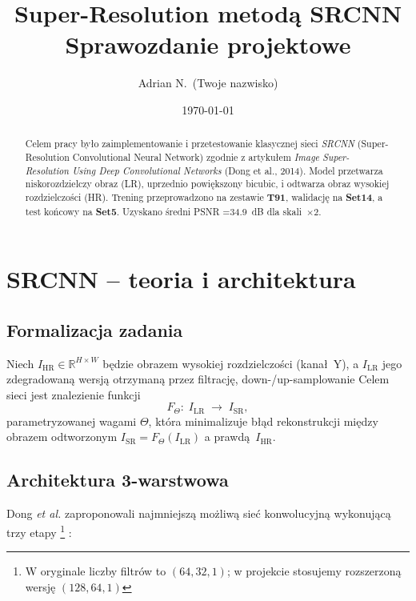 \documentclass[11pt]{article}
\title{\textbf{Super-Resolution metodą SRCNN}\\%
       \large Sprawozdanie projektowe}
\author{Adrian N.~(Twoje nazwisko)}
\date{\today}
\begin{document}
\maketitle
\begin{abstract}
Celem pracy było zaimplementowanie i przetestowanie klasycznej sieci
\emph{SRCNN} (Super-Resolution Convolutional Neural Network) zgodnie z artykułem
\emph{Image Super-Resolution Using Deep Convolutional Networks} (Dong et al.,
2014).  Model przetwarza niskorozdzielczy obraz (LR), uprzednio powiększony
bicubic, i odtwarza obraz wysokiej rozdzielczości (HR).  Trening przeprowadzono
na zestawie \textbf{T91}, walidację na \textbf{Set14}, a test końcowy na
\textbf{Set5}.  Uzyskano średni PSNR =\SI{34.9}{dB} dla skali~$\times2$.
\end{abstract}

\section{SRCNN – teoria i architektura}
\label{sec:srcnn}

\subsection{Formalizacja zadania}

Niech $I_\mathrm{HR}\!\in\!\mathbb R^{H\times W}$ będzie obrazem
wysokiej rozdzielczości (kanał~Y), a $I_\mathrm{LR}$ jego
zdegradowaną wersją otrzymaną przez filtrację, down-/up-samplowanie
Celem sieci jest znalezienie funkcji
\begin{equation}
  F_\Theta : \; I_\mathrm{LR}\;\longrightarrow\; I_\mathrm{SR},
\end{equation}
parametryzowanej wagami $\Theta$, która minimalizuje błąd rekonstrukcji
między obrazem odtworzonym $I_\mathrm{SR}=F_\Theta(I_\mathrm{LR})$ a prawdą
$\,I_\mathrm{HR}$.

\subsection{Architektura 3-warstwowa}

Dong \emph{et al.} zaproponowali najmniejszą możliwą sieć
konwolucyjną wykonującą trzy etapy
\footnote{
W oryginale liczby filtrów to $(64,32,1)$; w projekcie stosujemy
rozszerzoną wersję $(128,64,1)$
 }
 :
\end{document}

